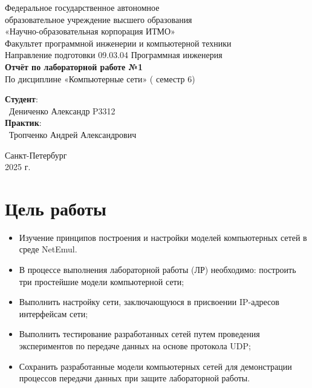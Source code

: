 \documentclass{article}
\begin{document}
\begin{center}
    \Large
    Федеральное государственное автономное \\
    образовательное учреждение высшего образования \\ 
    «Научно-образовательная корпорация ИТМО»\\
    \vspace{0.5cm}
    \large
    Факультет программной инженерии и компьютерной техники \\
    Направление подготовки 09.03.04 Программная инженерия \\
    \vspace{1cm}
    \Large
    \textbf{Отчёт по лабораторной работе №1} \\
        По дисциплине «Компьютерные сети» ( семестр 6)\\
    \large
    \vspace{8cm}

    \begin{minipage}{.33\textwidth}
    \end{minipage}
    \hfill
    \begin{minipage}{.4\textwidth}
    
        \textbf{Студент}: \vspace{.1cm} \\
        \ Дениченко Александр P3312\\
        \textbf{Практик}:  \\
        \ Тропченко Андрей Александрович
    \end{minipage}
    \vfill
Санкт-Петербург\\ 2025 г.
\end{center}
\pagestyle{empty}
\newpage
\pagestyle{plain}

\section*{Цель работы}
\begin{itemize}
    \item Изучение принципов построения и настройки моделей компьютерных
    сетей в среде NetEmul.
    \item В процессе выполнения лабораторной работы (ЛР) необходимо:
    построить три простейшие модели компьютерной сети;
    \item Выполнить настройку сети, заключающуюся в присвоении IP-адресов
    интерфейсам сети;
    \item Выполнить тестирование разработанных сетей путем проведения
    экспериментов по передаче данных на основе протокола UDP;
    \item Сохранить разработанные модели компьютерных сетей для демонстрации
    процессов передачи данных при защите лабораторной работы.
\end{itemize}
\end{document}
